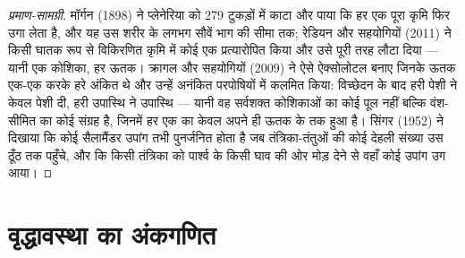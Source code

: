 \begin{proof}[प्रमाण-सामग्री]
मॉर्गन (1898) ने प्लेनेरिया को 279 टुकड़ों में काटा और पाया कि हर एक
पूरा कृमि फिर उगा लेता है, और यह उस शरीर के लगभग सौवें भाग की सीमा तक;
रेडियन और सहयोगियों (2011) ने किसी घातक रूप से विकिरणित कृमि में कोई एक
 प्रत्यारोपित किया और उसे पूरी तरह लौटा दिया --- यानी एक
कोशिका, हर ऊतक। क्रागल और सहयोगियों (2009) ने ऐसे ऐक्सोलोटल बनाए
जिनके ऊतक एक-एक करके हरे अंकित थे और उन्हें अनंकित परपोषियों में कलमित
किया: विच्छेदन के बाद हरी पेशी ने केवल पेशी दी, हरी उपास्थि ने उपास्थि
--- यानी वह  सर्वशक्त कोशिकाओं का कोई पूल नहीं बल्कि
वंश-सीमित  का कोई संग्रह है, जिनमें हर एक का 
केवल अपने ही ऊतक के  तक हुआ है। सिंगर (1952) ने दिखाया कि कोई
सैलामैंडर उपांग तभी पुनर्जनित होता है जब तंत्रिका-तंतुओं की कोई देहली
संख्या उस ठूँठ तक पहुँचे, और कि किसी तंत्रिका को पार्श्व के किसी घाव की
ओर मोड़ देने से वहाँ कोई उपांग उग आया।
\end{proof}

\section{वृद्धावस्था का अंकगणित}

